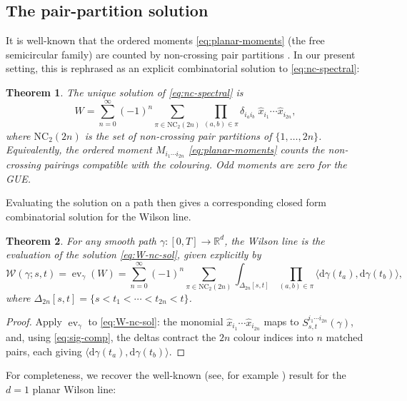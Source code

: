 \documentclass[11pt,a4paper]{article}
\newtheorem{theorem}{Theorem}[section]
\DeclareMathOperator{\ev}{ev}
\newcommand{\NC}{\mathrm{NC}_2}
\newcommand{\xh}{\hat{x}}
\newcommand{\cW}{\mathcal{W}}
\newcommand{\dd}{\mathrm{d}}
\begin{document}
\subsection{The pair-partition solution}\label{subsec:pp}

It is well-known that the ordered moments \eqref{eq:planar-moments} (the free semicircular family) are counted by non-crossing pair partitions \cite{nica2006lectures,anderson2010introduction}. In our present setting, this is rephrased as an explicit combinatorial solution to \eqref{eq:nc-spectral}:

\begin{theorem}\label{thm:nc2}
The unique solution of \eqref{eq:nc-spectral} is
\begin{equation}\label{eq:W-nc-sol}
  W = \sum_{n=0}^{\infty}(-1)^n\sum_{\pi\in\NC(2n)}
  \prod_{(a,b)\in\pi}\delta_{i_a i_b}\;\xh_{i_1}\cdots\xh_{i_{2n}},
\end{equation}
where $\NC(2n)$ is the set of non-crossing pair partitions of $\{1,\ldots,2n\}$. Equivalently, the ordered moment $M_{i_1\cdots i_{2n}}$ \eqref{eq:planar-moments} counts the non-crossing pairings compatible with the colouring. Odd moments are zero for the GUE.
\end{theorem}

Evaluating the solution on a path then gives a corresponding closed form combinatorial solution for the Wilson line.
\begin{theorem}\label{thm:complete}
For any smooth path $\gamma\colon[0,T]\to\mathbb{R}^d$, the Wilson line is the evaluation of the solution \eqref{eq:W-nc-sol}, given explicitly by
\begin{equation}\label{eq:W-explicit}
  \cW(\gamma;s,t)  = \ev_\gamma(W) = \sum_{n=0}^{\infty}(-1)^n\sum_{\pi\in\NC(2n)} \int_{\Delta_{2n}[s,t]} \prod_{(a,b)\in\pi}\langle\dd\gamma(t_a),\dd\gamma(t_b)\rangle,
\end{equation}
where $\Delta_{2n}[s,t]=\{s<t_1<\cdots<t_{2n}<t\}$. 
\end{theorem}

\begin{proof}
Apply $\ev_\gamma$ to \eqref{eq:W-nc-sol}: the monomial $\xh_{i_1}\cdots\xh_{i_{2n}}$ maps to $S^{i_1\cdots i_{2n}}_{s,t}(\gamma)$, and, using \eqref{eq:sig-comp}, the deltas contract the $2n$ colour indices into $n$ matched pairs, each giving $\langle\dd\gamma(t_a),\dd\gamma(t_b)\rangle$. 
\end{proof}

For completeness, we recover the well-known (see, for example \cite{cass2026free}) result for the $d=1$ planar Wilson line:
\end{document}
